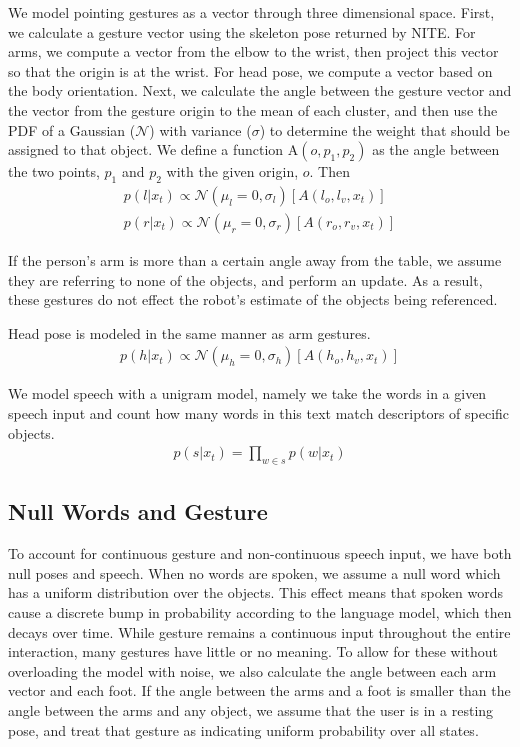 \documentclass[letterpaper, 10 pt, conference]{ieeeconf}
\begin{document}
  We model pointing gestures as a vector
through three dimensional space.  First, we calculate a gesture vector
using the skeleton pose returned by NITE.  For arms, we compute a
vector from the elbow to the wrist, then project this vector so that the origin is at the wrist.  For head pose, we compute a
vector based on the body orientation. Next, we calculate the angle between the gesture
vector and the vector from the gesture origin to the mean of each
cluster, and then use the PDF of a Gaussian ($\mathcal{N}$) with
variance ($\sigma$) to determine the weight that should be assigned to
that object. We define a function $\mbox{A}(o, p_1, p_2)$ as the angle
between the two points, $p_1$ and $p_2$ with the given origin, $o$.
Then
\begin{align}
p(l | x_t) \propto \mathcal{N}(\mu_l=0, \sigma_l)[A(l_o, l_v, x_t)]\\
p(r | x_t) \propto \mathcal{N}(\mu_r=0, \sigma_r)[A(r_o, r_v, x_t)]
\end{align}

If the person's arm is more than a certain angle away from the table,
we assume they are referring to none of the objects, and perform an
update.  As a result, these gestures do not effect the robot's
estimate of the objects being referenced.

Head pose is modeled in the same manner as arm gestures.
\begin{align}
p(h | x_t) \propto \mathcal{N}(\mu_h=0, \sigma_h)[A(h_o, h_v, x_t)]
\end{align}


  We model speech with a unigram model, namely we
take the words in a given speech input and count how many words in
this text match descriptors of specific objects.
\begin{align}
p(s |x_t) = \displaystyle \prod_{w \in s} p(w | x_t)
\end{align}


\subsection{Null Words and Gesture}

To account for continuous gesture and non-continuous speech input, we
have both null poses and speech.  When no words are spoken, we assume
a null word which has a uniform distribution over the objects.  This
effect means that spoken words cause a discrete bump in probability
according to the language model, which then decays over time. While
gesture remains a continuous input throughout the entire interaction,
many gestures have little or no meaning. To allow for these without
overloading the model with noise, we also calculate the angle between
each arm vector and each foot. If the angle between the arms and a
foot is smaller than the angle between the arms and any object, we
assume that the user is in a resting pose, and treat that gesture as
indicating uniform probability over all states.
\end{document}
